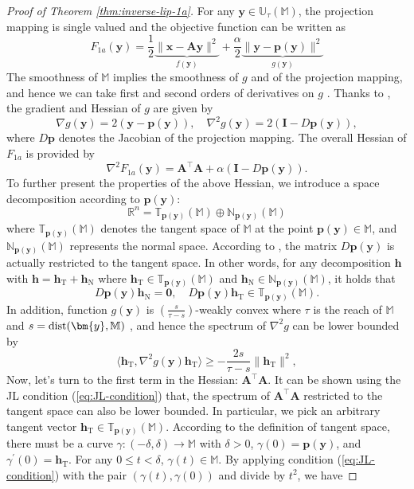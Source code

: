 \documentclass{amsart} %
\def\eqref#1{equation~\ref{#1}}
\def\vzero{{\bm{0}}}
\def\vh{{\bm{h}}}
\def\vp{{\bm{p}}}
\def\vx{{\bm{x}}}
\def\vy{{\bm{y}}}
\def\mA{{\bm{A}}}
\def\mI{{\bm{I}}}
\def\sM{{\mathbb{M}}}
\def\sN{{\mathbb{N}}}
\def\sR{{\mathbb{R}}}
\def\sT{{\mathbb{T}}}
\def\sU{{\mathbb{U}}}
\theoremstyle{definition}
\theoremstyle{remark}
\renewcommand{\eqref}[1]{\textup{(\ref{#1})}}
\begin{document}
\begin{proof}[Proof of Theorem \ref{thm:inverse-lip-1a}]
For any $\vy \in \sU_{\tau}(\sM)$, the projection mapping is single valued and the objective function can be written as \[F_{1a}(\vy) = \frac{1}{2} \underbrace{\|\vx - \mA \vy\|^2}_{f(\vy)} + \frac{\alpha}{2}\underbrace{\|\vy - \vp(\vy)\|^2}_{g(\vy)} \]
The smoothness of $\sM$ implies the smoothness of $g$ and of the projection mapping, and hence we can take first and second orders of derivatives on $g$ \cite[Theorem 2]{leobacher2021existence}. Thanks to \cite[Theorem 4.8]{federer1959curvature}, the gradient and Hessian of $g$ are given by
\[ \nabla g(\vy) = 2 \left( \vy - \vp(\vy) \right), \quad \nabla^2 g(\vy) = 2 \left( \mI - D \vp(\vy) \right), \]
where $D \vp$ denotes the Jacobian of the projection mapping. The overall Hessian of $F_{1a}$ is provided by
\begin{equation}
\label{eq:proof-hessian}
\nabla^2 F_{1a}(\vy) = \mA^\top\mA + \alpha \left( \mI - D \vp(\vy) \right).
\end{equation}
To further present the properties of the above Hessian, we introduce a space decomposition according to $\vp(\vy)$:
\[\sR^n = \sT_{\vp(\vy)}(\sM) \oplus \sN_{\vp(\vy)}(\sM)\] 
where $\sT_{\vp(\vy)}(\sM)$ denotes the tangent space of $\sM$ at the point $\vp(\vy) \in \sM$, and $\sN_{\vp(\vy)}(\sM)$ represents the normal space. According to \cite[Theorem C and Definition 7]{leobacher2021existence}, the matrix $D \vp(\vy)$ is actually restricted to the tangent space. In other words, for any decomposition $\vh$ with $\vh = \vh_{\mathrm{T}} + \vh_{\mathrm{N}}$ where $\vh_{\mathrm{T}} \in \sT_{\vp(\vy)}(\sM)$ and $\vh_{\mathrm{N}} \in \sN_{\vp(\vy)}(\sM)$, it holds that
\begin{equation}
\label{eq:proof-Dp-block-diag}
D \vp(\vy) \vh_{\mathrm{N}} = \vzero, \quad D \vp(\vy) \vh_{\mathrm{T}} \in \sT_{\vp(\vy)}(\sM).
\end{equation}
In addition, function $g(\vy)$ is $(\frac{s}{\tau - s})$-weakly convex where $\tau$ is the reach of $\sM$ and $s=\textup{dist}(\vy,\sM)$ \cite[Section 5]{nacry2022distance}, and hence the spectrum of $\nabla^2 g$ can be lower bounded by
\begin{equation}
\label{eq:proof-weak-convex}
\langle \vh_{\mathrm{T}}, \nabla^2 g(\vy) \vh_{\mathrm{T}} \rangle \geq - \frac{2 s}{\tau - s} \|\vh_{\mathrm{T}} \|^2,
\end{equation}
Now, let's turn to the first term in the Hessian: $\mA^\top\mA$. It can be shown using the JL condition \eqref{eq:JL-condition} that, the spectrum of $\mA^\top\mA$ restricted to the tangent space can also be lower bounded. In particular, we pick an arbitrary tangent vector $\vh_{\mathrm{T}} \in \sT_{\vp(\vy)}(\sM)$. According to the definition of tangent space, there must be a curve $\gamma: (-\delta, \delta) \to \sM$ with $\delta>0$, $\gamma(0) = \vp(\vy)$, and $\gamma^\prime(0) = \vh_{\mathrm{T}}$. For any $0 \leq t < \delta$, $\gamma(t) \in \sM$. By applying condition \eqref{eq:JL-condition} with the pair $(\gamma(t),\gamma(0))$ and divide by $t^2$, we have

\end{proof}
\end{document}
